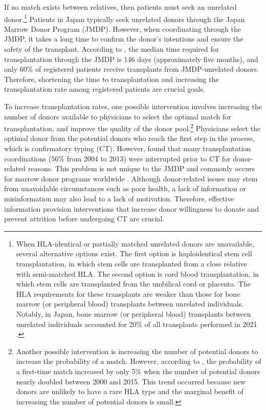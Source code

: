\documentclass[12pt, a4paper]{article}
\begin{document}
If no match exists between relatives, then patients must seek an unrelated donor.\footnote{When HLA-identical or partially matched unrelated donors are unavailable, several alternative options exist. The first option is haploidentical stem cell transplantation, in which stem cells are transplanted from a close relative with semi-matched HLA. The second option is cord blood transplantation, in which stem cells are transplanted from the umbilical cord or placenta. The HLA requirements for these transplants are weaker than those for bone marrow (or peripheral blood) transplants between unrelated individuals. Notably, in Japan, bone marrow (or peripheral blood) transplants between unrelated individuals accounted for 20\% of all transplants performed in 2021 \citep{JapaneseDataCenterf2022}.} Patients in Japan typically seek unrelated donors through the Japan Marrow Donor Program (JMDP). However, when coordinating through the JMDP, it takes a long time to confirm the donor's intentions and ensure the safety of the transplant. According to \citet{Hirakawa2018}, the median time required for transplantation through the JMDP is 146 days (approximately five months), and only 60\% of registered patients receive transplants from JMDP-unrelated donors. Therefore, shortening the time to transplantation and increasing the transplantation rate among registered patients are crucial goals.

To increase transplantation rates, one possible intervention involves increasing the number of donors available to physicians to select the optimal match for transplantation, and improve the quality of the donor pool.\footnote{Another possible intervention is increasing the number of potential donors to increase the probability of a match. However, according to \citet{Takanashi2016}, the probability of a first-time match increased by only 5\% when the number of potential donors nearly doubled between 2000 and 2015. This trend occurred because new donors are unlikely to have a rare HLA type and the marginal benefit of increasing the number of potential donors is small.} Physicians select the optimal donor from the potential donors who reach the first step in the process, which is confirmatory typing (CT). However, \citet{Hirakawa2018} found that many transplantation coordinations (56\% from 2004 to 2013) were interrupted prior to CT for donor-related reasons. This problem is not unique to the JMDP and commonly occurs for marrow donor programs worldwide \citep{Haylock2024}. Although donor-related issues may stem from unavoidable circumstances such as poor health, a lack of information or misinformation may also lead to a lack of motivation. Therefore, effective information provision interventions that increase donor willingness to donate and prevent attrition before undergoing CT are crucial.
\end{document}
